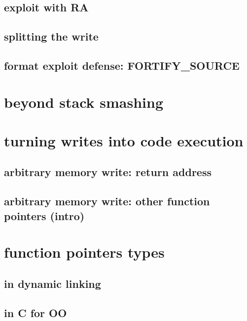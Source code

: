\subsection{exploit with RA}


\subsection{splitting the write}


\subsection{format exploit defense: FORTIFY\_SOURCE}


\section{beyond stack smashing}


\section{turning writes into code execution}


\subsection{arbitrary memory write: return address}

\subsection{arbitrary memory write: other function pointers (intro)}


\section{function pointers types}


\subsection{in dynamic linking}


\subsection{in C for OO}


